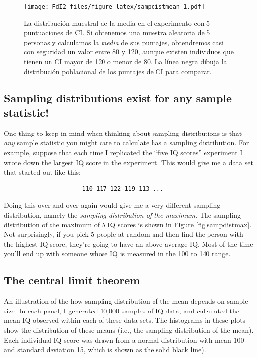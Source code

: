 \documentclass[spanish,]{book}
\begin{document}
\begin{figure}
\centering
\texttt{[image: FdI2\_files/figure-latex/sampdistmean-1.pdf]}
\caption{\label{fig:sampdistmean}La distribución muestral de la media en el
experimento con 5 puntuaciones de CI. Si obtenemos una muestra aleatoria
de 5 personas y calculamos la \emph{media} de sus puntajes, obtendremos
casi con seguridad un valor entre 80 y 120, aunque existen individuos
que tienen un CI mayor de 120 o menor de 80. La línea negra dibuja la
distribución poblacional de los puntajes de CI para comparar.}
\end{figure}

\subsection{Sampling distributions exist for any sample
statistic!}\label{sampling-distributions-exist-for-any-sample-statistic}

One thing to keep in mind when thinking about sampling distributions is
that \emph{any} sample statistic you might care to calculate has a
sampling distribution. For example, suppose that each time I replicated
the ``five IQ scores'' experiment I wrote down the largest IQ score in
the experiment. This would give me a data set that started out like
this:

\begin{verbatim}
                      110 117 122 119 113 ... 
\end{verbatim}

Doing this over and over again would give me a very different sampling
distribution, namely the \emph{sampling distribution of the maximum}.
The sampling distribution of the maximum of 5 IQ scores is shown in
Figure \ref{fig:sampdistmax}. Not surprisingly, if you pick 5 people at
random and then find the person with the highest IQ score, they're going
to have an above average IQ. Most of the time you'll end up with someone
whose IQ is measured in the 100 to 140 range.

\subsection{The central limit theorem}\label{clt}

An illustration of the how sampling distribution of the mean depends on
sample size. In each panel, I generated 10,000 samples of IQ data, and
calculated the mean IQ observed within each of these data sets. The
histograms in these plots show the distribution of these means (i.e.,
the sampling distribution of the mean). Each individual IQ score was
drawn from a normal distribution with mean 100 and standard deviation
15, which is shown as the solid black line).
\end{document}
